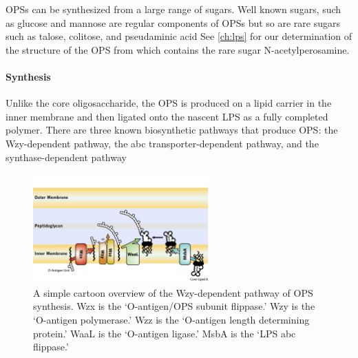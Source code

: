 \Acp{OPS} can be synthesized from a large range of sugars. Well known sugars, such as glucose and mannose are regular components of \acp{OPS} but so are rare sugars such as talose,
colitose, and pseudaminic acid See \cref{ch:lps} for our determination of the structure of the \ac{OPS} from \caulobacter which contains the rare sugar
N-acetylperosamine.

    \paragraph{Synthesis} Unlike the core oligosaccharide, the \ac{OPS} is produced on a lipid carrier in the inner membrane and then ligated onto the nascent \ac{LPS} as a fully
completed polymer. There are three known biosynthetic pathways that produce \ac{OPS}: the Wzy-dependent pathway, the \ac{abc} transporter-dependent pathway, and the
synthase-dependent pathway

\begin{figure}[htb]
  	\begin{center}
   		\includegraphics[width=0.6\textwidth]{intro/img/lpswzy.pdf}
   	\end{center}
   	\caption[A simple overview of the Wzy-dependent pathway]{ A simple cartoon
      overview of the Wzy-dependent pathway of \ac{OPS} synthesis. Wzx is the
      `O-antigen/\ac{OPS} subunit flippase.' Wzy is the `O-antigen polymerase.' Wzz
      is the `O-antigen length determining protein.' WaaL is the `O-antigen
      ligase.' MsbA is the `\ac{LPS} \ac{abc} flippase.'  }
\label{fig:lpswzy}
\end{figure}

